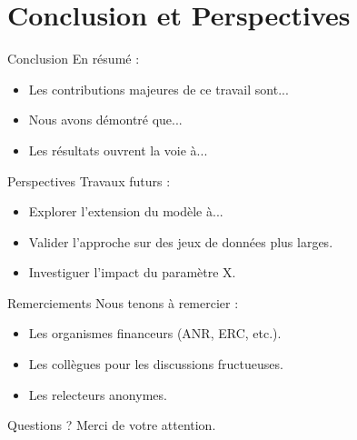 \documentclass[aspectratio=169]{beamer} %
\begin{document}
\section{Conclusion et Perspectives}

\begin{frame}{Conclusion}
  En résumé :
  \begin{itemize}
      \item Les contributions majeures de ce travail sont...
      \item Nous avons démontré que...
      \item Les résultats ouvrent la voie à...
  \end{itemize}
\end{frame}

\begin{frame}{Perspectives}
    Travaux futurs :
    \begin{itemize}
        \item Explorer l'extension du modèle à...
        \item Valider l'approche sur des jeux de données plus larges.
        \item Investiguer l'impact du paramètre X.
    \end{itemize}
\end{frame}


\begin{frame}{Remerciements}
    Nous tenons à remercier :
    \begin{itemize}
        \item Les organismes financeurs (ANR, ERC, etc.).
        \item Les collègues pour les discussions fructueuses.
        \item Les relecteurs anonymes.
    \end{itemize}
\end{frame}

\begin{frame}
  \vfill
  \centering
  {\Huge Questions ?}
  \vfill
  {\Large Merci de votre attention.}
  \vfill
\end{frame}
\end{document}
